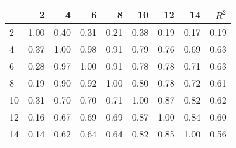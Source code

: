 \begin{tabular}{lrrrrrrrr}
\toprule
{} &     2 &     4 &     6 &     8 &    10 &    12 &    14 &  $R^2$ \\
\midrule
2  &  1.00 &  0.40 &  0.31 &  0.21 &  0.38 &  0.19 &  0.17 &   0.19 \\
4  &  0.37 &  1.00 &  0.98 &  0.91 &  0.79 &  0.76 &  0.69 &   0.63 \\
6  &  0.28 &  0.97 &  1.00 &  0.91 &  0.78 &  0.78 &  0.71 &   0.63 \\
8  &  0.19 &  0.90 &  0.92 &  1.00 &  0.80 &  0.78 &  0.72 &   0.61 \\
10 &  0.31 &  0.70 &  0.70 &  0.71 &  1.00 &  0.87 &  0.82 &   0.62 \\
12 &  0.16 &  0.67 &  0.69 &  0.69 &  0.87 &  1.00 &  0.84 &   0.60 \\
14 &  0.14 &  0.62 &  0.64 &  0.64 &  0.82 &  0.85 &  1.00 &   0.56 \\
\bottomrule
\end{tabular}
